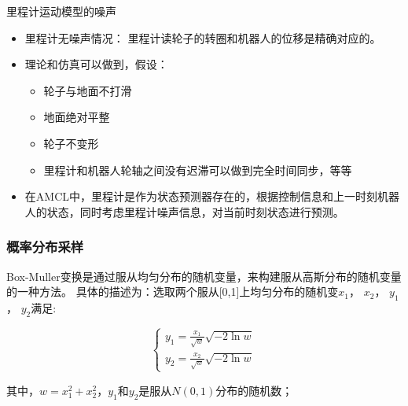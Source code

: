 \begin{frame}{里程计运动模型的噪声}
  \begin{itemize}
  \item 里程计无噪声情况： 里程计读轮子的转圈和机器人的位移是精确对应的。
  \item   理论和仿真可以做到，假设：
    \begin{itemize}
      \item 轮子与地面不打滑
      \item 地面绝对平整
      \item 轮子不变形
      \item 里程计和机器人轮轴之间没有迟滞可以做到完全时间同步，等等
    \end{itemize}
  \item 在AMCL中，里程计是作为{\color{red}状态预测器}存在的，根据控制信息和上一时刻机器人的状态，同时考虑里程计噪声信息，对当前时刻状态进行预测。
  \end{itemize}
\end{frame}  

\begin{frame}
  \frametitle{概率分布采样}

  {\color{red}Box-Muller变换}是通过服从均匀分布的随机变量，来构建服从高斯分布的随机变量的一种方法。
  具体的描述为：选取两个服从[0,1]上均匀分布的随机变$x_1$， $x_2$， $y_1$， $y_2$满足:

  \begin{equation}
    \begin{cases}
      y_1 = \frac{x_1}{\sqrt{w}} \sqrt{-2 \ln{w}} \\
      y_2 = \frac{x_2}{\sqrt{w}} \sqrt{-2 \ln{w}}
    \end{cases}
  \end{equation}

  其中，$w = x_1^2 + x_2^2$，$y_1$和$y_2$是服从$N(0,1)$分布的随机数；


\end{frame}


